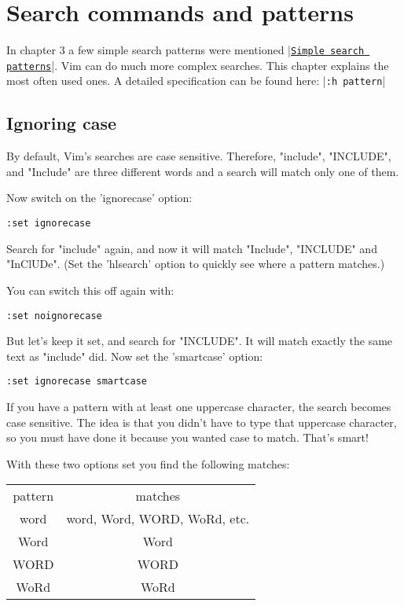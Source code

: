 \section{Search commands and patterns}
\label{Search commands and patterns}
In chapter 3 a few simple search patterns were mentioned |\hyperref[Simple search patterns]{\texttt{Simple search patterns}}|.
Vim can do much more complex searches.
This chapter explains the most often used ones.
A detailed specification can be found here: |\verb!:h pattern!|
\subsection{Ignoring case}
By default, Vim's searches are case sensitive.
Therefore, "include", "INCLUDE", and "Include" are three different words and a search will match only one of them.

Now switch on the 'ignorecase' option:

\begin{Verbatim}[samepage=true]
 :set ignorecase
\end{Verbatim}

Search for "include" again, and now it will match "Include", "INCLUDE" and "InClUDe".
(Set the 'hlsearch' option to quickly see where a pattern matches.)

You can switch this off again with:

\begin{Verbatim}[samepage=true]
 :set noignorecase
\end{Verbatim}

But let's keep it set, and search for "INCLUDE".
It will match exactly the same text as "include" did.
Now set the 'smartcase' option:

\begin{Verbatim}[samepage=true]
 :set ignorecase smartcase
\end{Verbatim}

If you have a pattern with at least one uppercase character, the search becomes case sensitive.
The idea is that you didn't have to type that uppercase character, so you must have done it because you wanted case to match.
That's smart!

With these two options set you find the following matches:

\begin{center} \begin{tabular}{c c}
				pattern & matches \\
				word & word, Word, WORD, WoRd, etc.\\
				Word & Word\\
				WORD & WORD\\
				WoRd & WoRd\\
\end{tabular} \end{center}

